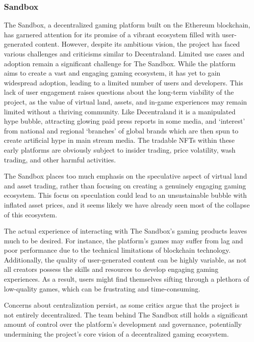 \subsubsection{Sandbox}
The Sandbox, a decentralized gaming platform built on the Ethereum blockchain, has garnered attention for its promise of a vibrant ecosystem filled with user-generated content. However, despite its ambitious vision, the project has faced various challenges and criticisms similar to Decentraland. Limited use cases and adoption remain a significant challenge for The Sandbox. While the platform aims to create a vast and engaging gaming ecosystem, it has yet to gain widespread adoption, leading to a limited number of users and developers. This lack of user engagement raises questions about the long-term viability of the project, as the value of virtual land, assets, and in-game experiences may remain limited without a thriving community. Like Decentraland it is a manipulated hype bubble, attracting glowing paid press reports in some media, and `interest' from national and regional `branches' of global brands  which are then spun to create artificial hype in main stream media. The tradable NFTs within these early platforms are obviously subject to insider trading, price volatility, wash trading, and other harmful activities. \par
The Sandbox places too much emphasis on the speculative aspect of virtual land and asset trading, rather than focusing on creating a genuinely engaging gaming ecosystem. This focus on speculation could lead to an unsustainable bubble with inflated asset prices, and it seems likely we have already seen most of the collapse of this ecosystem.\par
The actual experience of interacting with The Sandbox's gaming products leaves much to be desired. For instance, the platform's games may suffer from lag and poor performance due to the technical limitations of blockchain technology. Additionally, the quality of user-generated content can be highly variable, as not all creators possess the skills and resources to develop engaging gaming experiences. As a result, users might find themselves sifting through a plethora of low-quality games, which can be frustrating and time-consuming.\par
Concerns about centralization persist, as some critics argue that the project is not entirely decentralized. The team behind The Sandbox still holds a significant amount of control over the platform's development and governance, potentially undermining the project's core vision of a decentralized gaming ecosystem.
